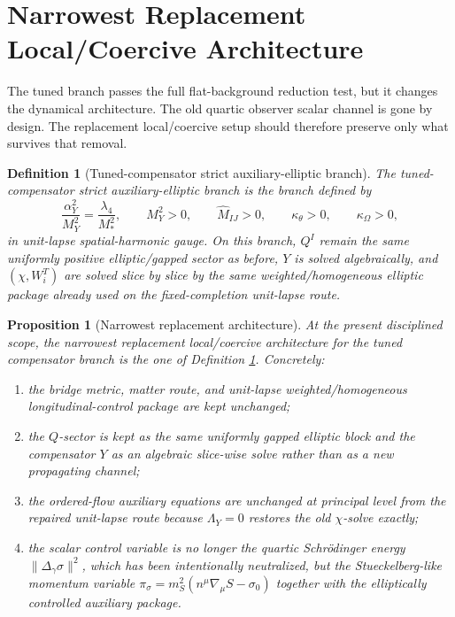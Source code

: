 \documentclass[11pt]{article}
\newtheorem{definition}{Definition}
\newtheorem{proposition}{Proposition}
\begin{document}
\section{Narrowest Replacement Local/Coercive Architecture}

The tuned branch passes the full flat-background reduction test, but it changes the dynamical architecture. The old quartic observer scalar channel is gone by design. The replacement local/coercive setup should therefore preserve only what survives that removal.

\begin{definition}[Tuned-compensator strict auxiliary-elliptic branch]
\label{def:strictcomp}
The \emph{tuned-compensator strict auxiliary-elliptic branch} is the branch defined by
\begin{equation}
\frac{\alpha_Y^2}{M_Y^2}=\frac{\lambda_4}{M_*^2},
\qquad
M_Y^2>0,
\qquad
\widehat M_{IJ}>0,
\qquad
\kappa_\theta>0,
\qquad
\kappa_\Omega>0,
\label{eq:strictcomp}
\end{equation}
in unit-lapse spatial-harmonic gauge. On this branch, \(Q^I\) remain the same uniformly positive elliptic/gapped sector as before, \(Y\) is solved algebraically, and \((\chi,W_i^T)\) are solved slice by slice by the same weighted/homogeneous elliptic package already used on the fixed-completion unit-lapse route.
\end{definition}

\begin{proposition}[Narrowest replacement architecture]
\label{prop:architecture}
At the present disciplined scope, the narrowest replacement local/coercive architecture for the tuned compensator branch is the one of Definition \ref{def:strictcomp}. Concretely:
\begin{enumerate}
    \item the bridge metric, matter route, and unit-lapse weighted/homogeneous longitudinal-control package are kept unchanged;
    \item the \(Q\)-sector is kept as the same uniformly gapped elliptic block and the compensator \(Y\) as an algebraic slice-wise solve rather than as a new propagating channel;
    \item the ordered-flow auxiliary equations are unchanged at principal level from the repaired unit-lapse route because \(\Lambda_Y=0\) restores the old \(\chi\)-solve exactly;
    \item the scalar control variable is no longer the quartic Schr\"odinger energy \(\|\Delta_\gamma\sigma\|^2\), which has been intentionally neutralized, but the Stueckelberg-like momentum variable \(\pi_\sigma=m_S^2(n^\mu\nabla_\mu S-\sigma_0)\) together with the elliptically controlled auxiliary package.
\end{enumerate}
\end{proposition}
\end{document}
